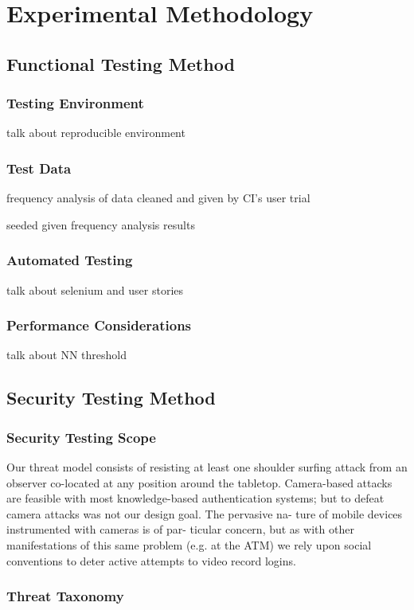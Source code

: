 \chapter{Experimental Methodology}

\section{Functional Testing Method}

\subsection{Testing Environment}

talk about reproducible environment

\subsection{Test Data}

frequency analysis of data cleaned and given by CI's user trial

seeded given frequency analysis results

\subsection{Automated Testing}

talk about selenium and user stories

\subsection{Performance Considerations}

talk about NN threshold

\section{Security Testing Method}

\subsection{Security Testing Scope}

Our threat model consists of resisting at least one shoulder surfing attack from an observer co-located at any position around the tabletop. Camera-based attacks are feasible with most knowledge-based authentication systems; but to defeat camera attacks was not our design goal. The pervasive na- ture of mobile devices instrumented with cameras is of par- ticular concern, but as with other manifestations of this same problem (e.g. at the ATM) we rely upon social conventions to deter active attempts to video record logins.

\subsection{Threat Taxonomy}